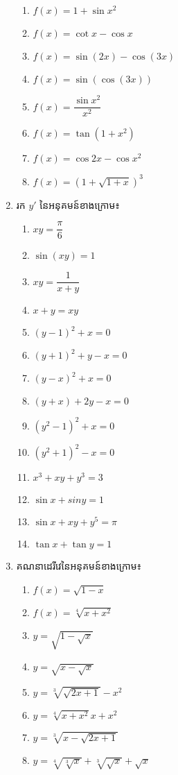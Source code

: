 \documentclass[a4paper,12pt]{article}
\begin{document}
\begin{enumerate}
\begin{multicols}{2}
\begin{enumerate}
\item $f(x)=1+\sin x^2$
\item $f(x)=\cot x-\cos x$
\item $f(x)=\sin (2x)-\cos (3x)$
\item $f (x) = \sin (\cos (3x))$
\item $f(x)=\dfrac{\sin x^2}{ x^2}$
\item $f(x)=\tan (1+x^2)$
\item $ f(x)=\cos 2x-\cos x^2$
\item $f(x)= (1+\sqrt{1+x})^3$
\end{enumerate}
\end{multicols}
\item រក $y'$ នៃអនុគមន៍ខាងក្រោម៖
\begin{multicols}{2}
\begin{enumerate}
\item $xy = \dfrac{ \pi}{ 6}$
\item $ \sin (xy) = 1$
\item $xy =\dfrac{1}{x+y}$
\item $x+y=xy$
\item $(y-1)^2 +x=0$
\item $(y+1)^2 +y-x=0$
\item $(y-x)^2 +x=0$
\item $(y+x) +2y-x=0$
\item $ (y^2 -1)^2 +x=0$ 
\item $ (y^2 +1)^ 2 -x=0$
\item $x^3+xy+y^3=3$
\item $\sin x+sin y=1$
\item $\sin x+xy+y^5 =\pi$
\item $\tan x+\tan y=1$
\end{enumerate}
\end{multicols}
\item គណនាដេរីវេនៃអនុគមន៍ខាងក្រោម៖
\begin{multicols}{2}
\begin{enumerate}
\item $f(x)= \sqrt{1-x}$
\item $f(x)= \sqrt[4]{ x+x^2}$
\item $y= \sqrt{1-\sqrt{x}}$
\item $y= \sqrt{x-\sqrt{ x}}$
\item $y=\sqrt[3]{\sqrt{ 2x+1}}-x^2$
\item $y= \sqrt[4]{x+x^2} x+x^2$
\item $y=\sqrt[3]{ x- \sqrt{2x+1}}$
\item $y= \sqrt[4]{\sqrt[3]{x}}+\sqrt[3]{\sqrt{x}}+\sqrt{x}$

\end{enumerate}
\end{multicols}
\end{enumerate}
\end{document}
